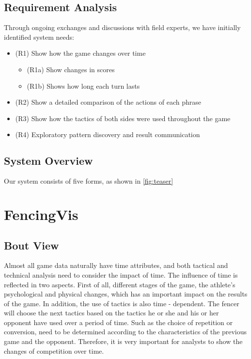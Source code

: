 \documentclass[journal]{vgtc}                %
\begin{document}
\subsection{Requirement Analysis}
Through ongoing exchanges and discussions with field experts, we have initially identified system needs:
\begin{itemize}
	\item (R1) Show how the game changes over time
	\begin{itemize}
		\item (R1a) Show changes in scores
		\item (R1b) Shows how long each turn lasts
	\end{itemize}
	\item (R2) Show a detailed comparison of the actions of each phrase
	\item (R3) Show how the tactics of both sides were used throughout the game
	\item (R4) Exploratory pattern discovery and result communication
\end{itemize}
\subsection{System Overview}
Our system consists of five forms, as shown in \autoref{fig:teaser}
\section{FencingVis}
\subsection{Bout View}
Almost all game data naturally have time attributes, and both tactical and technical analysis need to consider the impact of time.
The influence of time is reflected in two aspects.
First of all, different stages of the game, the athlete's psychological and physical changes, which has an important impact on the results of the game.
In addition, the use of tactics is also time - dependent.
The fencer will choose the next tactics based on the tactics he or she and his or her opponent have used over a period of time.
Such as the choice of repetition or conversion, need to be determined according to the characteristics of the previous game and the opponent.
Therefore, it is very important for analysts to show the changes of competition over time.
\end{document}
